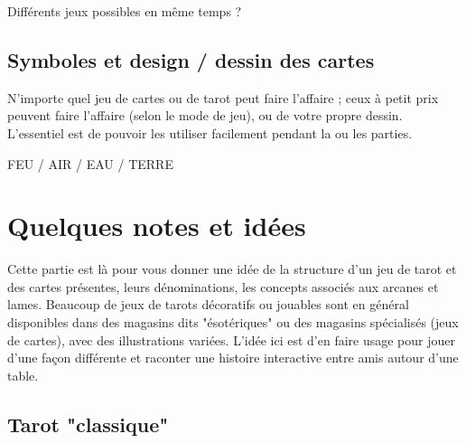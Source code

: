 \documentclass[11pt,twoside,a5paper]{book}
\begin{document}
Diff{\'e}rents jeux possibles en m{\^e}me temps ?~\\

\subsection{Symboles et design / dessin des cartes}

N'importe quel jeu de cartes ou de tarot peut faire l'affaire ; ceux {\`a} petit prix peuvent faire l'affaire (selon le mode de jeu), ou de votre propre dessin. L'essentiel est de pouvoir les utiliser facilement pendant la ou les parties.~\\

\begin{minipage}[ht]{0.45\textwidth}
	FEU / AIR / EAU / TERRE
\end{minipage} \hfill \begin{minipage}[ht]{0.45\textwidth}
	\def\triangle{--++(120:1)--++(240:1)--cycle}
	\def\triangleReverse{--++(240:1)--cycle}
\end{minipage}

\clearpage

\section{Quelques notes et id{\'e}es}

Cette partie est l{\`a} pour vous donner une id{\'e}e de la structure d'un jeu de tarot et des cartes pr{\'e}sentes, leurs d{\'e}nominations, les concepts associ{\'e}s aux arcanes et lames. Beaucoup de jeux de tarots d{\'e}coratifs ou jouables sont en g{\'e}n{\'e}ral disponibles dans des magasins dits "{\'e}sot{\'e}riques" ou des magasins sp{\'e}cialis{\'e}s (jeux de cartes), avec des illustrations vari{\'e}es. L'id{\'e}e ici est d'en faire usage pour jouer d'une fa\c{c}on diff{\'e}rente et raconter une histoire interactive entre amis autour d'une table. %

\subsection{Tarot "classique"}
\end{document}
